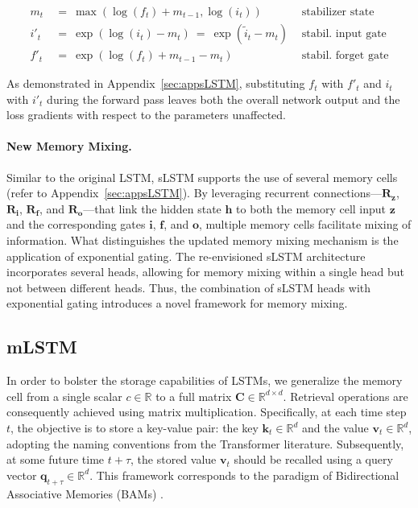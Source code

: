 \begin{align}
\label{eq:slstmstabil}
m_t \ &= \ \max \left( \log ( f_t ) + m_{t-1} , \log ( i_t ) \right) &\text{stabilizer state} \\
i'_t \ &= \ \!\exp \left( \log \left ( i_t \right) - m_t \right) \ = \ \!\exp \left( \tilde{i}_t - m_t \right) \ \, 
  &\text{stabil. input gate} \\
f'_t \ &= \ \!\exp \left( \log \left( f_t \right) + m_{t-1} - m_t \right) \ \, 
  &\text{stabil. forget gate}
\end{align}

As demonstrated in Appendix~\ref{sec:appsLSTM}, substituting $f_t$ with $f'_t$ and $i_t$ with $i'_t$ during the forward pass leaves both the overall network output and the loss gradients with respect to the parameters unaffected.

\paragraph{New Memory Mixing.} Similar to the original LSTM, sLSTM supports the use of several memory cells (refer to Appendix~\ref{sec:appsLSTM}). By leveraging recurrent connections—$\mathbf{R}_{\mathbf{z}}$, $\mathbf{R}_{\mathbf{i}}$, $\mathbf{R}_{\mathbf{f}}$, and $\mathbf{R}_{\mathbf{o}}$—that link the hidden state $\mathbf{h}$ to both the memory cell input $\mathbf{z}$ and the corresponding gates $\mathbf{i}$, $\mathbf{f}$, and $\mathbf{o}$, multiple memory cells facilitate mixing of information. What distinguishes the updated memory mixing mechanism is the application of exponential gating. The re-envisioned sLSTM architecture incorporates several heads, allowing for memory mixing within a single head but not between different heads. Thus, the combination of sLSTM heads with exponential gating introduces a novel framework for memory mixing.

\subsection{mLSTM}
\label{sec:mLSTM}

In order to bolster the storage capabilities of LSTMs, we generalize the memory cell from a single scalar $c \in \mathbb{R}$ to a full matrix $\mathbf{C} \in \mathbb{R}^{d \times d}$. Retrieval operations are consequently achieved using matrix multiplication. Specifically, at each time step $t$, the objective is to store a key-value pair: the key $\mathbf{k}_t \in \mathbb{R}^d$ and the value $\mathbf{v}_t \in \mathbb{R}^d$, adopting the naming conventions from the Transformer literature. Subsequently, at some future time $t + \tau$, the stored value $\mathbf{v}_t$ should be recalled using a query vector $\mathbf{q}_{t+\tau} \in \mathbb{R}^d$. This framework corresponds to the paradigm of Bidirectional Associative Memories (BAMs) \citep{Kohonen:72,Anderson:72,Nakano:72,Anderson:77}.

